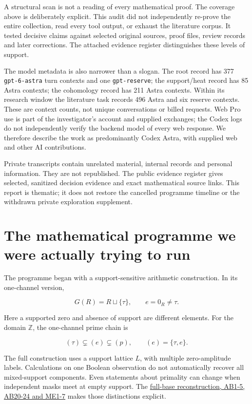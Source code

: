 \documentclass[
  british,
  11pt,
  a4paper,
]{article}
\begin{document}
A structural scan is not a reading of every mathematical proof. The
coverage above is deliberately explicit. This audit did not
independently re-prove the entire collection, read every tool output, or
exhaust the literature corpus. It tested decisive claims against
selected original sources, proof files, review records and later
corrections. The attached evidence register distinguishes these levels
of support.

The model metadata is also narrower than a slogan. The root record has
377 \texttt{gpt-6-astra} turn contexts and one \texttt{gpt-reserve}; the
support/heat record has 85 Astra contexts; the cohomology record has 211
Astra contexts. Within its research window the literature task records
496 Astra and six reserve contexts. These are context counts, not unique
conversations or billed requests. Web Pro use is part of the
investigator's account and supplied exchanges; the Codex logs do not
independently verify the backend model of every web response. We
therefore describe the work as predominantly Codex Astra, with supplied
web and other AI contributions.

Private transcripts contain unrelated material, internal records and
personal information. They are not republished. The public evidence
register gives selected, sanitized decision evidence and exact
mathematical source links. This report is thematic; it does not restore
the cancelled programme timeline or the withdrawn private exploration
supplement.

\section{The mathematical programme we were actually trying to
run}\label{the-mathematical-programme-we-were-actually-trying-to-run}

The programme began with a support-sensitive arithmetic construction. In
its one-channel version,

\[G(R)=R\sqcup\{\tau\},\qquad e=0_R\ne\tau.\]

Here a supported zero and absence of support are different elements. For
the domain \(\mathbb Z\), the one-channel prime chain is

\[(\tau)\subsetneq(e)\subsetneq(p),\qquad(e)=\{\tau,e\}.\]

The full construction uses a support lattice \(L\), with multiple
zero-amplitude labels. Calculations on one Boolean observation do not
automatically recover all mixed-support components. Even statements
about primality can change when independent masks meet at empty support.
The
\href{https://github.com/KokunoYumeto/zeta-function-research-reader/blob/3c78cfbd9e194d35117b33277c421c6564ce3dbf/workbenches/splitzero-tandem/continuations/20260923-full-prime-support/031/01_REBUILT_MATHEMATICS.tex}{full-base
reconstruction, AB1-5, AB20-24 and ME1-7} makes those distinctions
explicit.
\end{document}
